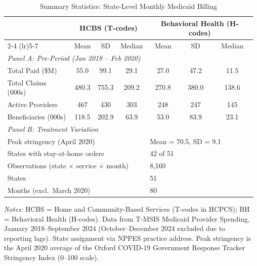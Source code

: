 \begin{table}[htbp]
\centering
\caption{Summary Statistics: State-Level Monthly Medicaid Billing}
\label{tab:sumstats}
\small
\begin{tabular}{lcccccc}
\hline\hline
 & \multicolumn{3}{c}{HCBS (T-codes)} & \multicolumn{3}{c}{Behavioral Health (H-codes)} \\
\cmidrule(lr){2-4} \cmidrule(lr){5-7}
 & Mean & SD & Median & Mean & SD & Median \\
\hline
\multicolumn{7}{l}{\textit{Panel A: Pre-Period (Jan 2018 -- Feb 2020)}} \\[3pt]
Total Paid (\$M) & 55.0 & 99.1 & 29.1 & 27.0 & 47.2 & 11.5 \\
Total Claims (000s) & 480.3 & 755.3 & 209.2 & 270.8 & 380.0 & 138.6 \\
Active Providers & 467 & 430 & 303 & 248 & 247 & 145 \\
Beneficiaries (000s) & 118.5 & 202.9 & 63.9 & 53.0 & 83.9 & 23.1 \\
[6pt]
\multicolumn{7}{l}{\textit{Panel B: Treatment Variation}} \\[3pt]
\multicolumn{4}{l}{Peak stringency (April 2020)} & \multicolumn{3}{l}{Mean = 70.5, SD = 9.1} \\
\multicolumn{4}{l}{States with stay-at-home orders} & \multicolumn{3}{l}{42 of 51} \\
\multicolumn{4}{l}{Observations (state $\times$ service $\times$ month)} & \multicolumn{3}{l}{8,160} \\
\multicolumn{4}{l}{States} & \multicolumn{3}{l}{51} \\
\multicolumn{4}{l}{Months (excl.~March 2020)} & \multicolumn{3}{l}{80} \\
\hline\hline
\end{tabular}
\begin{minipage}{0.95\textwidth}
\vspace{4pt}
\footnotesize
\textit{Notes:} HCBS = Home and Community-Based Services (T-codes in HCPCS); BH = Behavioral Health (H-codes). Data from T-MSIS Medicaid Provider Spending, January 2018--September 2024 (October--December 2024 excluded due to reporting lags). State assignment via NPPES practice address. Peak stringency is the April 2020 average of the Oxford COVID-19 Government Response Tracker Stringency Index (0--100 scale).
\end{minipage}
\end{table}
